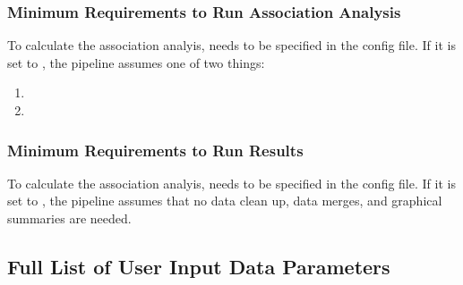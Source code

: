 \documentclass[letterpaper,10pt,english]{sphinxmanual}
\begin{document}
\subsubsection{Minimum Requirements to Run Association Analysis}
\label{\detokenize{assocAnalysisParameters:minimum-requirements-to-run-association-analysis}}\label{\detokenize{assocAnalysisParameters::doc}}
To calculate the association analyis,  needs to be specified in the config file.  If it is set to , the pipeline assumes one of two things:
\begin{enumerate}
%
\item {} 

\item {} 

\end{enumerate}


\subsubsection{Minimum Requirements to Run Results}
\label{\detokenize{resultsParameters:minimum-requirements-to-run-results}}\label{\detokenize{resultsParameters::doc}}
To calculate the association analyis,  needs to be specified in the config file.  If it is set to , the pipeline assumes that no data clean up, data merges, and graphical summaries are needed.


\subsection{Full List of User Input Data Parameters}
\label{\detokenize{parameters:full-list-of-user-input-data-parameters}}
\end{document}
